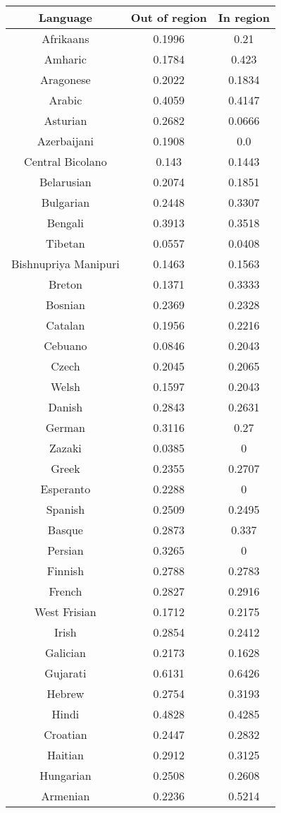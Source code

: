 \begin{figure}[h]
\begin{tabular}{ccc}\hline\hline
Language&Out of region&In region\\
\hline
Afrikaans&0.1996&0.21\\
Amharic&0.1784&0.423\\
Aragonese&0.2022&0.1834\\
Arabic&0.4059&0.4147\\
Asturian&0.2682&0.0666\\
Azerbaijani&0.1908&0.0\\
Central Bicolano&0.143&0.1443\\
Belarusian&0.2074&0.1851\\
Bulgarian&0.2448&0.3307\\
Bengali&0.3913&0.3518\\
Tibetan&0.0557&0.0408\\
Bishnupriya Manipuri&0.1463&0.1563\\
Breton&0.1371&0.3333\\
Bosnian&0.2369&0.2328\\
Catalan&0.1956&0.2216\\
Cebuano&0.0846&0.2043\\
Czech&0.2045&0.2065\\
Welsh&0.1597&0.2043\\
Danish&0.2843&0.2631\\
German&0.3116&0.27\\
Zazaki&0.0385&0\\
Greek&0.2355&0.2707\\
Esperanto&0.2288&0\\
Spanish&0.2509&0.2495\\
Basque&0.2873&0.337\\
Persian&0.3265&0\\
Finnish&0.2788&0.2783\\
French&0.2827&0.2916\\
West Frisian&0.1712&0.2175\\
Irish&0.2854&0.2412\\
Galician&0.2173&0.1628\\
Gujarati&0.6131&0.6426\\
Hebrew&0.2754&0.3193\\
Hindi&0.4828&0.4285\\
Croatian&0.2447&0.2832\\
Haitian&0.2912&0.3125\\
Hungarian&0.2508&0.2608\\
Armenian&0.2236&0.5214\\

\end{tabular}
\end{figure}
